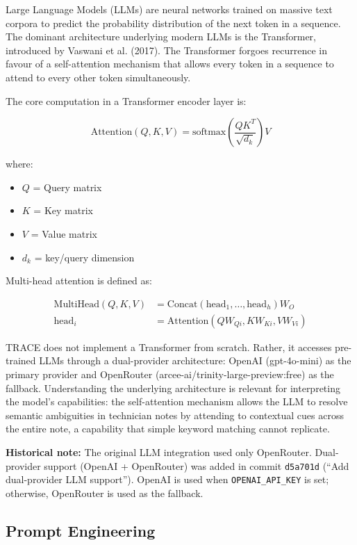 \documentclass[10pt]{article}
\begin{document}
Large Language Models (LLMs) are neural networks trained on massive text corpora to predict the probability distribution of the next token in a sequence. The dominant architecture underlying modern LLMs is the Transformer, introduced by Vaswani et al. (2017). The Transformer forgoes recurrence in favour of a self-attention mechanism that allows every token in a sequence to attend to every other token simultaneously.

The core computation in a Transformer encoder layer is:

\begin{equation}
\text{Attention}(Q, K, V) = \text{softmax}\left(\frac{QK^T}{\sqrt{d_k}}\right)V
\end{equation}

where:
\begin{itemize}
    \item $Q$ = Query matrix
    \item $K$ = Key matrix
    \item $V$ = Value matrix
    \item $d_k$ = key/query dimension
\end{itemize}

Multi-head attention is defined as:

\begin{align}
\text{MultiHead}(Q, K, V) &= \text{Concat}(\text{head}_1, \ldots, \text{head}_h)W_O \\
\text{head}_i &= \text{Attention}(QW_{Qi}, KW_{Ki}, VW_{Vi})
\end{align}

TRACE does not implement a Transformer from scratch. Rather, it accesses pre-trained LLMs through a dual-provider architecture: OpenAI (gpt-4o-mini) as the primary provider and OpenRouter (arcee-ai/trinity-large-preview:free) as the fallback. Understanding the underlying architecture is relevant for interpreting the model's capabilities: the self-attention mechanism allows the LLM to resolve semantic ambiguities in technician notes by attending to contextual cues across the entire note, a capability that simple keyword matching cannot replicate.

\textbf{Historical note:} The original LLM integration used only OpenRouter. Dual-provider support (OpenAI + OpenRouter) was added in commit \texttt{d5a701d} (``Add dual-provider LLM support''). OpenAI is used when \texttt{OPENAI\_API\_KEY} is set; otherwise, OpenRouter is used as the fallback.

\subsection{Prompt Engineering}
\end{document}
